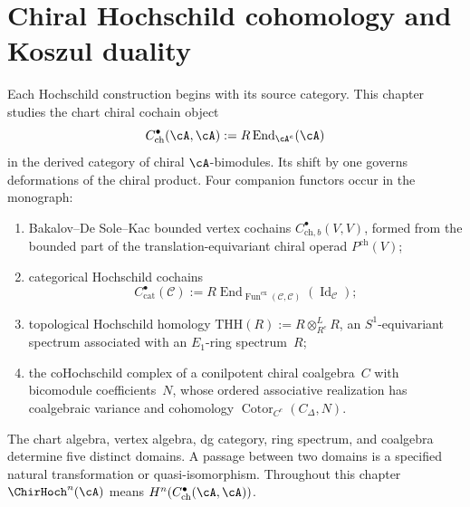 \chapter{Chiral Hochschild cohomology and Koszul duality}
\label{chap:deformation-theory}\label{ch:chiral-hochschild-koszul}


\begin{remark}
\label{rem:three-hochschild-discipline}

Each Hochschild construction begins with its source category.  This
chapter studies the chart chiral cochain object
\[
 C^\bullet_{\mathrm{ch}}(\cA,\cA)
 :=R\operatorname{End}_{\cA^e}(\cA)
\]
in the derived category of chiral \(\cA\)-bimodules.  Its shift by one
governs deformations of the chiral product.  Four companion functors
occur in the monograph:
\begin{enumerate}[label=\textup{(\alph*)}]
\item Bakalov--De Sole--Kac bounded vertex cochains
 \(C^\bullet_{\mathrm{ch},b}(V,V)\), formed from the bounded part of
 the translation-equivariant chiral operad \(P^{\mathrm{ch}}(V)\);
\item categorical Hochschild cochains
 \[
 C^\bullet_{\mathrm{cat}}(\mathcal C)
 :=R\operatorname{End}_{\operatorname{Fun}^{\mathrm{ex}}(\mathcal C,
 \mathcal C)}(\operatorname{Id}_{\mathcal C});
 \]
\item topological Hochschild homology
 \(\mathrm{THH}(R):=R\otimes^{L}_{R^e}R\), an
 \(S^1\)-equivariant spectrum associated with an \(E_1\)-ring
 spectrum~\(R\);
\item the coHochschild complex of a conilpotent chiral coalgebra~\(C\)
 with bicomodule coefficients~\(N\), whose ordered associative
 realization has coalgebraic variance and cohomology
 \(\operatorname{Cotor}_{C^e}(C_\Delta,N)\).
\end{enumerate}
The chart algebra, vertex algebra, dg category, ring spectrum, and
coalgebra determine five distinct domains.  A passage between two
domains is a specified natural transformation or quasi-isomorphism.
Throughout this chapter \(\ChirHoch^n(\cA)\) means
\(H^n(C^\bullet_{\mathrm{ch}}(\cA,\cA))\).
\end{remark}

